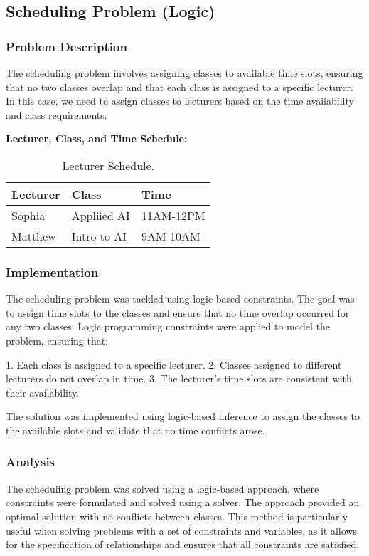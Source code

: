 \documentclass[12pt]{article}
\begin{document}
\subsection{Scheduling Problem (Logic)}
\subsubsection{Problem Description}
The scheduling problem involves assigning classes to available time slots, ensuring that no two classes overlap and that each class is assigned to a specific lecturer. In this case, we need to assign classes to lecturers based on the time availability and class requirements.

\textbf{Lecturer, Class, and Time Schedule:}
\begin{table}[h!]
    \centering
    \begin{tabular}{|l|l|l|}
        \hline
        Lecturer & Class & Time \\
        \hline
        Sophia & Appliied AI & 11AM-12PM \\
        Matthew & Intro to AI & 9AM-10AM \\
        \hline
    \end{tabular}
    \caption{Lecturer Schedule.}
    \label{tab:schedule}
\end{table}

\subsubsection{Implementation}
The scheduling problem was tackled using logic-based constraints. The goal was to assign time slots to the classes and ensure that no time overlap occurred for any two classes. Logic programming constraints were applied to model the problem, ensuring that:

1. Each class is assigned to a specific lecturer.
2. Classes assigned to different lecturers do not overlap in time.
3. The lecturer's time slots are consistent with their availability.

The solution was implemented using logic-based inference to assign the classes to the available slots and validate that no time conflicts arose.

\subsubsection{Analysis}
The scheduling problem was solved using a logic-based approach, where constraints were formulated and solved using a solver. The approach provided an optimal solution with no conflicts between classes. This method is particularly useful when solving problems with a set of constraints and variables, as it allows for the specification of relationships and ensures that all constraints are satisfied.
\end{document}
